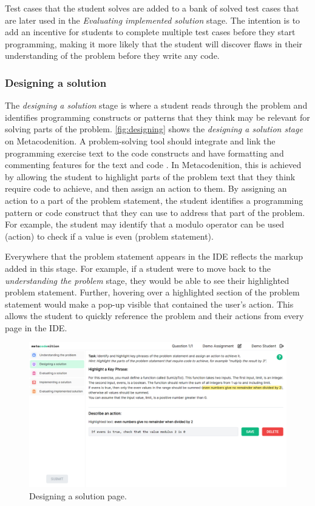 \documentclass[sigconf,anonymous]{acmart}
\begin{document}
Test cases that the student solves are added to a bank of solved test cases that are later used in the \emph{Evaluating implemented solution} stage. The intention is to add an incentive for students to complete multiple test cases before they start programming, making it more likely that the student will discover flaws in their understanding of the problem before they write any code.


\subsubsection{Designing a solution} \label{sec:design-interventions-designing}
The \emph{designing a solution} stage is where a student reads through the problem and identifies programming constructs or patterns that they think may be relevant for solving parts of the problem. 
\autoref{fig:designing} shows the \emph{designing a solution stage} on Metacodenition. A problem-solving tool should integrate and link the programming exercise text to the code constructs and have formatting and commenting features for the text and code \cite{saenz2022}. In Metacodenition, this is achieved by allowing the student to highlight parts of the problem text that they think require code to achieve, and then assign an action to them. By assigning an action to a part of the problem statement, the student identifies a programming pattern or code construct that they can use to address that part of the problem. For example, the student may identify that a modulo operator can be used (action) to check if a value is even (problem statement).

Everywhere that the problem statement appears in the IDE reflects the markup added in this stage. For example, if a student were to move back to the \emph{understanding the problem} stage, they would be able to see their highlighted problem statement. Further, hovering over a highlighted section of the problem statement would make a pop-up visible that contained the user’s action. This allows the student to quickly reference the problem and their actions from every page in the IDE.

\begin{figure}[h!]
  \centering
  \includegraphics[width=\linewidth]{designing-a-solution}
  \caption{Designing a solution page.}
  \label{fig:designing}
\end{figure}
\end{document}
